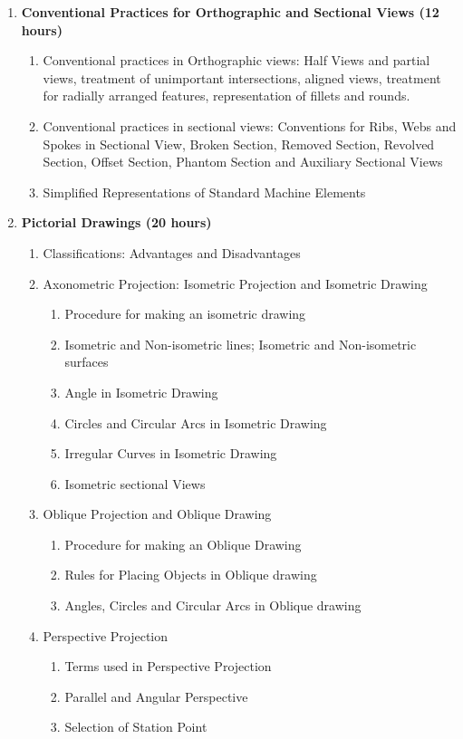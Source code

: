 \begin{enumerate}
    \item \textbf{ Conventional Practices for Orthographic and Sectional Views \hfill (12 hours)}
    \begin{enumerate}
        \item Conventional practices in Orthographic views: Half Views and partial views, treatment of unimportant intersections, aligned views, treatment for radially arranged features, representation of fillets and rounds.
        
        \item Conventional practices in sectional views: Conventions for Ribs, Webs and Spokes in Sectional View, Broken Section, Removed Section, Revolved Section, Offset Section, Phantom Section and Auxiliary Sectional Views
        
        \item Simplified Representations of Standard Machine Elements
        
    \end{enumerate}
    
    \item \textbf{Pictorial Drawings \hfill (20 hours)}
    \begin{enumerate}
        \item Classifications: Advantages and Disadvantages
        \item Axonometric Projection: Isometric Projection and Isometric Drawing
        \begin{enumerate}
            \item Procedure for making an isometric drawing
            \item Isometric and Non-isometric lines; Isometric and Non-isometric surfaces
            \item Angle in Isometric Drawing
            \item Circles and Circular Arcs in Isometric Drawing
            \item Irregular Curves in Isometric Drawing
            \item Isometric sectional Views
        \end{enumerate}
        \item Oblique Projection and Oblique Drawing
        \begin{enumerate}
            \item Procedure for making an Oblique Drawing
            \item Rules for Placing Objects in Oblique drawing
            \item Angles, Circles and Circular Arcs in Oblique drawing
        \end{enumerate}
        \item Perspective Projection
        \begin{enumerate}
            \item Terms used in Perspective Projection
            \item Parallel and Angular Perspective
            \item Selection of Station Point
        \end{enumerate}
    \end{enumerate}
    

\end{enumerate}
